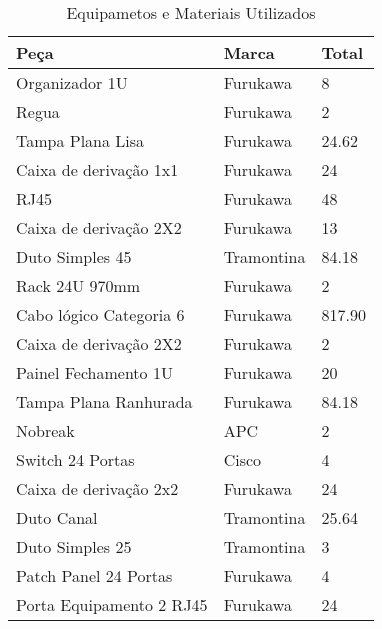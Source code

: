 \begin{table}[h!]
	\centering
	\caption{Equipametos e Materiais Utilizados}
	\label{equip}
	\begin{tabular}{|l|l|l|}
		\hline
		\textbf{Peça}            & \textbf{Marca} & \textbf{Total} \\ \hline
		Organizador 1U           & Furukawa       & 8              \\ \hline
		Regua                    & Furukawa       & 2              \\ \hline
		Tampa Plana Lisa         & Furukawa       & 24.62          \\ \hline
		Caixa de derivação 1x1   & Furukawa       & 24             \\ \hline
		RJ45                     & Furukawa       & 48             \\ \hline
		Caixa de derivação 2X2   & Furukawa       & 13             \\ \hline
		Duto Simples 45          & Tramontina     & 84.18          \\ \hline
		Rack 24U 970mm           & Furukawa       & 2              \\ \hline
		Cabo lógico Categoria 6  & Furukawa       & 817.90         \\ \hline
		Caixa de derivação 2X2   & Furukawa       & 2              \\ \hline
		Painel Fechamento 1U     & Furukawa       & 20             \\ \hline
		Tampa Plana Ranhurada    & Furukawa       & 84.18          \\ \hline
		Nobreak                  & APC            & 2              \\ \hline
		Switch 24 Portas         & Cisco          & 4              \\ \hline
		Caixa de derivação 2x2   & Furukawa       & 24             \\ \hline
		Duto Canal               & Tramontina     & 25.64          \\ \hline
		Duto Simples 25          & Tramontina     & 3              \\ \hline
		Patch Panel 24 Portas    & Furukawa       & 4              \\ \hline
		Porta Equipamento 2 RJ45 & Furukawa       & 24             \\ \hline
	\end{tabular}
\end{table}